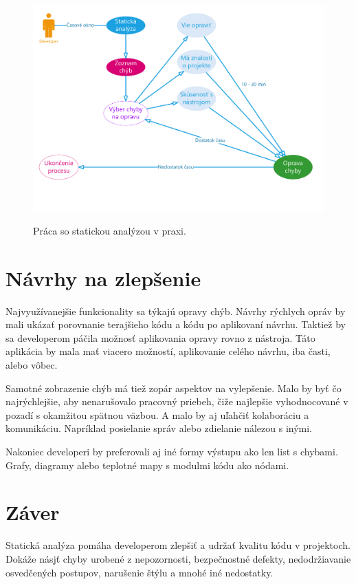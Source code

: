 \documentclass[10pt,twoside,slovak,a4paper]{article}
\begin{document}
\begin{figure}[tbh]
	\centering
	\caption{Práca so statickou analýzou v praxi.}
	\includegraphics[scale=0.50]{vyuzitie.pdf}
	\label{diagram}
\end{figure}


\section{Návrhy na zlepšenie} \label{navrhy}
Najvyužívanejšie funkcionality sa týkajú opravy chýb. Návrhy rýchlych opráv by mali ukázať porovnanie terajšieho kódu a
kódu po aplikovaní návrhu. Taktiež by sa developerom páčila možnosť aplikovania opravy rovno z nástroja. Táto aplikácia
by mala mať viacero možností, aplikovanie celého návrhu, iba časti, alebo vôbec.

Samotné zobrazenie chýb má tiež zopár aspektov na vylepšenie. Malo by byť čo najrýchlejšie, aby nenarušovalo pracovný
priebeh, čiže najlepšie vyhodnocované v pozadí s okamžitou spätnou väzbou. A malo by aj uľahčiť kolaboráciu a
komunikáciu. Napríklad posielanie správ alebo zdielanie nálezou s inými.

Nakoniec developeri by preferovali aj iné formy výstupu ako len list s chybami. Grafy, diagramy alebo teplotné mapy
s modulmi kódu ako nódami.\cite{BrittanyJohnson,LisaNguyen}


\section{Záver}
Statická analýza pomáha developerom zlepšiť a udržať kvalitu kódu v projektoch. Dokáže násjť chyby urobené z
nepozornosti, bezpečnostné defekty, nedodržiavanie osvedčených postupov, narušenie štýlu a mnohé iné nedostatky.
\end{document}
